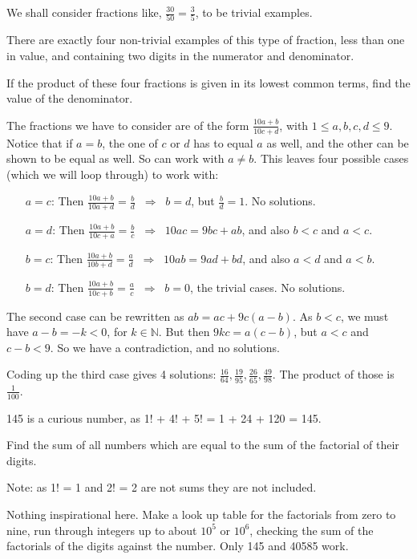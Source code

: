 We shall consider fractions like, $\tfrac{30}{50} = \tfrac 35$, to be trivial examples.

There are exactly four non-trivial examples of this type of fraction, less than one in value, and containing two digits in the numerator and denominator.

If the product of these four fractions is given in its lowest common terms, find the value of the denominator.

The fractions we have to consider are of the form $\tfrac{10a+b}{10c+d}$, with $1 \leq a,b,c,d \leq 9$.  Notice
 that if $a=b$, the one of $c$ or $d$ has to equal $a$ as well, and the other can be shown to be equal as well.
 So can work with $a \neq b$.  This leaves four possible
cases (which we will loop through) to work with: 
\begin{itemize}
\item[$a=c$:] Then $\tfrac{10a+b}{10a+d} = \tfrac bd\;\;\Rightarrow \;\; b=d$, but $\tfrac bd = 1$.  No solutions.
\item[$a=d$:] Then $\tfrac{10a+b}{10c+a} = \tfrac bc\;\;\Rightarrow \;\; 10ac=9bc+ab$, and also $b < c$ and $a < c$.
\item[$b=c$:] Then $\tfrac{10a+b}{10b+d} = \tfrac ad\;\; \Rightarrow\;\; 10ab=9ad+bd$, and also $a < d$ and $a < b$.
\item[$b=d$:] Then $\tfrac{10a+b}{10c+b} = \tfrac ac\;\; \Rightarrow \;\;b=0$, the trivial cases.  No solutions. 
\end{itemize}
The second case can be rewritten as $ab = ac + 9c(a-b)$.  As $b<c$, we must have $a-b=-k < 0$, for $k\in\mathbb{N}$.
But then $9kc = a(c-b)$, but $a < c$ and $c-b < 9$.  So we have a contradiction, and no solutions.

Coding up the third case gives 4 solutions:  $\tfrac{16}{64}, \tfrac{19}{95}, \tfrac{26}{65}, \tfrac{49}{98}$.
The product of those is $\tfrac 1{100}$.






145 is a curious number, as 1! + 4! + 5! = 1 + 24 + 120 = 145.

Find the sum of all numbers which are equal to the sum of the factorial of their digits.

\footnotesize
Note: as 1! = 1 and 2! = 2 are not sums they are not included.
\normalsize

Nothing inspirational here.  Make a look up table for the factorials from zero to nine,
run through integers up to about $10^5$ or $10^6$, checking the sum of the factorials
of the digits against the number.  Only 145 and 40585 work.

